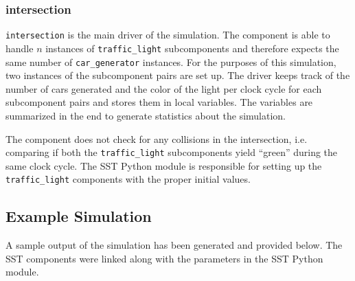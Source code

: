 \documentclass{article}
\begin{document}
      \subsubsection{intersection}
      \lstinline{intersection} is the main driver of the simulation. The component is able to handle
      $n$ instances of \lstinline{traffic_light} subcomponents and therefore expects the same number
      of \lstinline{car_generator} instances. For the purposes of this simulation, two instances of
      the subcomponent pairs are set up. The driver keeps track of the number of cars generated and
      the color of the light per clock cycle for each subcomponent pairs and stores them in local
      variables. The variables are summarized in the end to generate statistics about the
      simulation.

      The component does not check for any collisions in the intersection, i.e. comparing if both
      the \lstinline{traffic_light} subcomponents yield ``green'' during the same clock cycle. The
      SST Python module is responsible for setting up the \lstinline{traffic_light} components with
      the proper initial values.

    \subsection{Example Simulation}
    A sample output of the simulation has been generated and provided below. The SST components were
    linked along with the parameters in the SST Python module.
\end{document}
